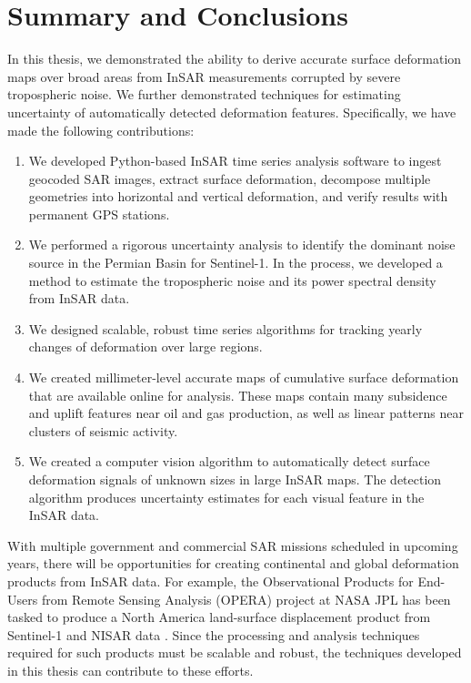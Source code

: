 
\chapter{Summary and Conclusions}
\label{CHAP:7}

In this thesis, we demonstrated the ability to derive accurate surface deformation maps over broad areas from InSAR measurements corrupted by severe tropospheric noise. We further demonstrated techniques for estimating uncertainty of automatically detected deformation features. Specifically, we have made the following contributions:


\begin{enumerate}
	
	\item We developed Python-based InSAR time series analysis software to ingest geocoded SAR images, extract surface deformation, decompose multiple geometries into horizontal and vertical deformation, and verify results with permanent GPS stations.
	
	\item We performed a rigorous uncertainty analysis to identify the dominant noise source in the Permian Basin for Sentinel-1.  In the process, we developed a method to estimate the tropospheric noise and its power spectral density from InSAR data.
	
	\item We designed scalable, robust time series algorithms for tracking yearly changes of deformation over large regions.
	
	\item We created millimeter-level accurate maps of cumulative surface deformation that are available online for analysis. These maps contain many subsidence and uplift features near oil and gas production, as well as linear patterns near clusters of seismic activity.
	
	\item We created a computer vision algorithm to automatically detect surface deformation signals of unknown sizes in large InSAR maps. The detection algorithm produces uncertainty estimates for each visual feature in the InSAR data.
	
		
\end{enumerate}

With multiple government and commercial SAR missions scheduled in upcoming years, there will be opportunities for creating continental and global deformation products from InSAR data.
For example, the Observational Products for End-Users from Remote Sensing Analysis (OPERA) project at NASA JPL has been tasked to produce a North America land-surface displacement product from Sentinel-1 and NISAR data
\citep{Bekaert2021IntroducingOperaProject}.
Since the processing and analysis techniques required for such products must be scalable and robust, the techniques developed in this thesis can contribute to these efforts.

